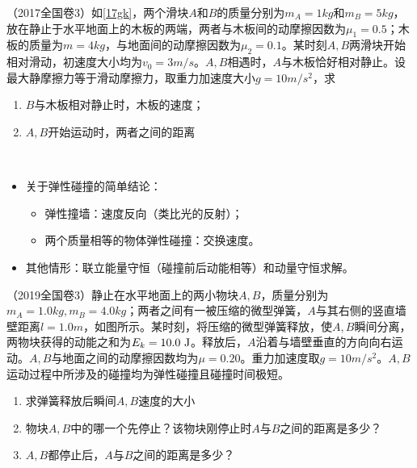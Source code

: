 \documentclass[a4paper,9pt]{ctexart}
\begin{document}
\begin{eg} \label{17w}
（2017全国卷3）如\cref{17gk}，两个滑块$A$和$B$的质量分别为$m_A = 1\unit{kg}$和$m_B = 5\unit{kg}$，放在静止于水平地面上的木板的两端，两者与木板间的动摩擦因数为$\mu_1 = 0.5$；木板的质量为$m = 4\unit{kg}$，与地面间的动摩擦因数为$\mu_2 = 0.1$。某时刻$A,B$两滑块开始相对滑动，初速度大小均为$v_0 = 3\unit{m/s}$。$A,B$相遇时，$A$与木板恰好相对静止。设最大静摩擦力等于滑动摩擦力，取重力加速度大小$g=10\unit{m/s^2}$，求
\begin{enumerate}
\item
$B$与木板相对静止时，木板的速度；
\item
$A,B$开始运动时，两者之间的距离
\end{enumerate}
\end{eg}
\begin{ans}
\ 
\vspace{8cm}
\end{ans}
\begin{itemize}
\item
关于弹性碰撞的简单结论：
\begin{itemize}
\item
弹性撞墙：速度反向（类比光的反射）；
\item
两个质量相等的物体弹性碰撞：交换速度。
\end{itemize}
\item
其他情形：联立能量守恒（碰撞前后动能相等）和动量守恒求解。
\end{itemize}
\newpage
\begin{eg}
（2019全国卷3）静止在水平地面上的两小物块$A,B$，质量分别为$m_A = 1.0\unit{kg}, m_B = 4.0\unit{kg}$；两者之间有一被压缩的微型弹簧，$A$与其右侧的竖直墙壁距离$l = 1.0\unit{m}$，如图所示。某时刻，将压缩的微型弹簧释放，使$A,B$瞬间分离，两物块获得的动能之和为$E_k = 10.0{\rm \ J}$。释放后，$A$沿着与墙壁垂直的方向向右运动。$A,B$与地面之间的动摩擦因数均为$\mu = 0.20$。重力加速度取$g = 10 \unit{m/s^2}$。$A,B$运动过程中所涉及的碰撞均为弹性碰撞且碰撞时间极短。
\begin{enumerate}
\item
求弹簧释放后瞬间$A,B$速度的大小
\item
物块$A,B$中的哪一个先停止？该物块刚停止时$A$与$B$之间的距离是多少？
\item
$A,B$都停止后，$A$与$B$之间的距离是多少？
\end{enumerate}
\end{eg}
\begin{ans}
\ 
\vspace{8cm}
\end{ans}
\end{document}
